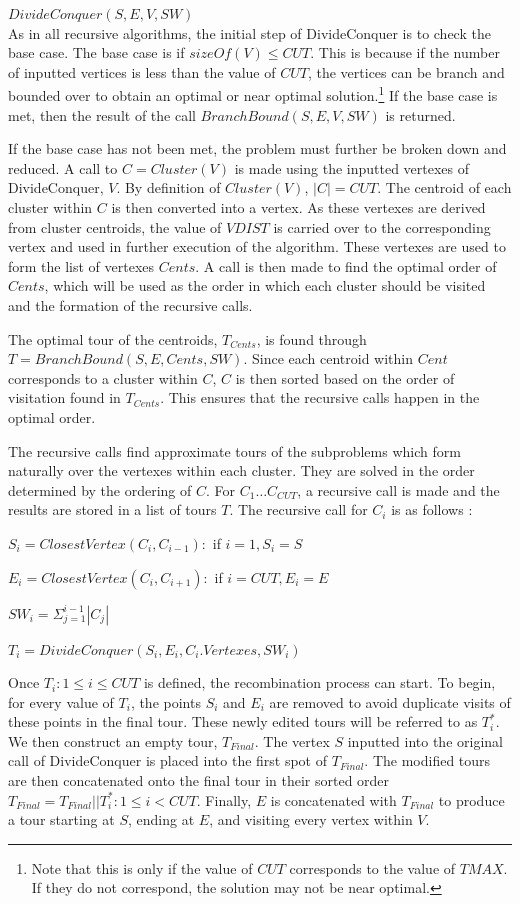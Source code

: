 \documentclass[sigconf, anonymous, pdftex]{acmart}
\begin{document}
$DivideConquer(S, E, V, SW)$\\

As in all recursive algorithms, the initial step of DivideConquer is to check the base case. The base case is if $sizeOf(V) \leq CUT$. This is because if the number of inputted vertices is less than the value of $CUT$, the vertices can be branch and bounded over to obtain an optimal or near optimal solution.\footnote{Note that this is only if the value of $CUT$ corresponds to the value of $TMAX$. If they do not correspond, the solution may not be near optimal.} If the base case is met, then the result of the call $BranchBound(S, E, V, SW)$ is returned.

If the base case has not been met, the problem must further be broken down and reduced. A call to $C = Cluster(V)$ is made using the inputted vertexes of DivideConquer, $V$. By definition of $Cluster(V)$, $|C| = CUT$. The centroid of each cluster within $C$ is then converted into a vertex. As these vertexes are derived from cluster centroids, the value of $VDIST$ is carried over to the corresponding vertex and used in further execution of the algorithm. These vertexes are used to form the list of vertexes $Cents$. A call is then made to find the optimal order of $Cents$, which will be used as the order in which each cluster should be visited and the formation of the recursive calls.

The optimal tour of the centroids, $T_{Cents}$, is found through $T = BranchBound(S, E, Cents, SW)$. Since each centroid within $Cent$ corresponds to a cluster within $C$, $C$ is then sorted based on the order of visitation found in $T_{Cents}$. This ensures that the recursive calls happen in the optimal order.

The recursive calls find approximate tours of the subproblems which form naturally over the vertexes within each cluster. They are solved in the order determined by the ordering of $C$. For $C_1 \dots C_{CUT}$, a recursive call is made and the results are stored in a list of tours $T$. The recursive call for $C_i$ is as follows :

$S_i = ClosestVertex(C_i, C_{i-1}) : $ if $i = 1, S_i = S$

$E_i = ClosestVertex(C_i, C_{i+1}) : $ if $i = CUT, E_i = E$

$SW_i = \Sigma_{j=1}^{i-1} |C_j|$

$T_i = DivideConquer(S_i, E_i, C_i.Vertexes, SW_i)$

Once $T_i : 1 \leq i \leq CUT$ is defined, the recombination process can start. To begin, for every value of $T_i$, the points $S_i$ and $E_i$ are removed to avoid duplicate visits of these points in the final tour. These newly edited tours will be referred to as $T_i^*$. We then construct an empty tour, $T_{Final}$. The vertex $S$ inputted into the original call of DivideConquer is placed into the first spot of $T_{Final}$. The modified tours are then concatenated onto the final tour in their sorted order $T_{Final} = T_{Final} || T_i^* : 1 \leq i < CUT$. Finally, $E$ is concatenated with $T_{Final}$ to produce a tour starting at $S$, ending at $E$, and visiting every vertex within $V$.
\end{document}
